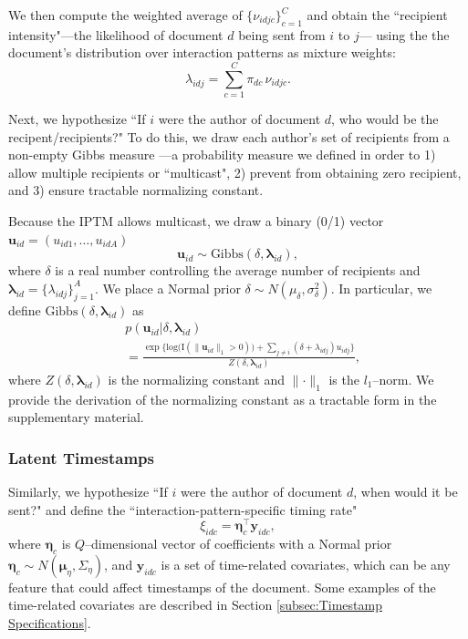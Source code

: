 \documentclass{article}
\begin{document}
We then compute the weighted average of $\{\nu_{idjc}\}_{c=1}^C$ and obtain the ``recipient intensity"---the likelihood of document $d$ being sent from $i$ to $j$--- using the the document's distribution over interaction patterns as mixture weights:
\begin{equation}
\lambda_{idj} =\sum_{c=1}^{C} \pi_{dc}\, \nu_{idjc}.
\end{equation}

Next, we hypothesize ``If $i$ were the
author of document $d$, who would be the recipent/recipients?" To do this, we draw each author's set of recipients from a non-empty Gibbs measure \cite{fellows2017removing}---a probability measure we defined in order to 1) allow multiple recipients or ``multicast", 2) prevent from obtaining zero recipient, and 3) ensure tractable normalizing constant. 

Because the IPTM allows multicast, we draw a binary (0/1) vector $\boldsymbol{u}_{id}= (u_{id1},
	\ldots, u_{idA})$
	\begin{equation} \boldsymbol{u}_{id}  \sim
	\mbox{Gibbs}(\delta, \boldsymbol{\lambda}_{id}),
	\end{equation}
where $\delta$ is a real number controlling the average number of recipients and $\boldsymbol{\lambda}_{id}= \{\lambda_{idj}\}_{j=1}^A$. We place a Normal prior $\delta \sim N(\mu_\delta,\sigma^2_\delta)$. In particular, we define $\mbox{Gibbs}(\delta, \boldsymbol{\lambda}_{id})$ as
\begin{equation}
\begin{aligned}
&p(\boldsymbol{u}_{id}|\delta, \boldsymbol{\lambda}_{id}) \\&= \frac{\exp\Big\{\mbox{log}\big(\text{I}( \lVert \boldsymbol{u}_{id}\rVert_1 > 0 )\big) + \sum_{j \neq i} (\delta+\lambda_{idj})u_{idj}\Big\}}{Z(\delta,\boldsymbol{\lambda}_{id})} ,
\end{aligned}
\label{eqn:Gibbs}
\end{equation}
where $Z(\delta,\boldsymbol{\lambda}_{id})$ is the normalizing constant and $\lVert \cdot \rVert_1$ is the $l_1$--norm. We provide the derivation of the normalizing constant as a tractable form in the supplementary material. 

\subsubsection{Latent Timestamps}\label{subsubsec:Hypothetical Timestamps}
Similarly, we hypothesize ``If $i$ were the author of document $d$, when would it be sent?" and define the ``interaction-pattern-specific timing rate"
\begin{equation}
\xi_{idc} = \boldsymbol{\eta}_c^\top \boldsymbol{y}_{idc},
\end{equation}
where $\boldsymbol{\eta}_c$ is $Q$--dimensional vector of coefficients with a Normal prior $\boldsymbol{\eta}_c \sim N(\boldsymbol{\mu}_\eta,\Sigma_\eta)$, and $\boldsymbol{y}_{idc}$ is a set of time-related covariates, which can be any feature that could affect timestamps of the document. Some examples of the time-related covariates are described in Section \ref{subsec:Timestamp Specifications}.
\end{document}
